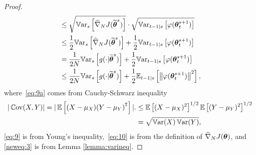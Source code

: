 \begin{proof}
\begin{align}
	&\leq
	\sqrt{\Vars{\gradApp{\wt{\vtheta}^s}{N}}} \cdot \sqrt{\Varts[t-1]{\varphi(\vtheta_t^{s+1})}} \label{eq:9a}\\
	&\leq	
	\frac{1}{2}\Vars{\gradApp{\wt{\vtheta}^s}{N}} +\frac{1}{2}\Varts[t-1]{\varphi(\vtheta_t^{s+1})}\label{eq:9}\\
	&=
	\frac{1}{2N}\Vars{g(\cdot\vert\wt{\vtheta}^s)} +\frac{1}{2}\Varts[t-1]{\varphi(\vtheta_t^{s+1})} \label{eq:10}\\
	&\leq
	\frac{1}{2N}\Vars{g(\cdot\vert\wt{\vtheta}^s)} +\frac{1}{2}\Ets[t-1]{\norm[]{\varphi(\vtheta_t^{s+1})}^2},
	\label{neweq:3}
	\end{align}
	where~\eqref{eq:9a} comes from Cauchy-Schwarz inequality
	\begin{align}
	|\Cov(X,Y)| = |\EVV[]{(X-\mu_X)\transpose{(Y-\mu_Y)}}|.& \leq \EVV[]{(X-\mu_X)^2}^{1/2}\EVV[]{(Y-\mu_Y)^2}^{1/2}  \\
	& = \sqrt{\Var(X) \Var(Y)},
	\end{align}
	\eqref{eq:9} is from Young's inequality,~\eqref{eq:10} is from the definition of $\gradApp{\vtheta}{N}$, and \eqref{neweq:3} is from Lemma \ref{lemma:varineq}.
\end{proof}

